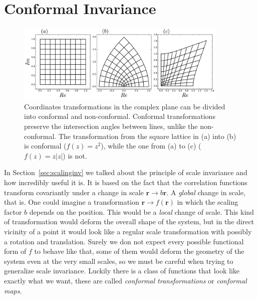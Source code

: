 \section{Conformal Invariance}
\label{ch:conf}

\begin{figure}[b]
\begin{center}
    \includegraphics[width=0.9\textwidth]{chapters/ch3-conf/figs/cmapex}
\end{center}
\caption{Coordinates transformations in the complex plane can be divided into
    conformal and non-conformal. Conformal transformations preserve the
    intersection angles between lines, unlike the non-conformal. The
    transformation from the square lattice in (a) into (b) is conformal
    ($f(z)=z^2$), while the one from (a) to (c) ($f(z)=z|z|$) is not.}
\label{fig:cmapex}
\end{figure}

In Section~\ref{sec:scalinginv} we talked about the principle of scale invariance
and how incredibly useful it is. It is based on the fact that the correlation
functions transform covariantly under a change in scale $\mathbf{r}\rightarrow
b\mathbf{r}$. A \textit{global} change in scale, that is. One could imagine a
transformation $\mathbf{r}\rightarrow f(\mathbf{r})$ in which the scaling
factor $b$ depends on the position. This would be a \textit{local} change of
scale. This kind of transformation would deform the overall shape of the
system, but in the direct vicinity of a point it would look like a regular
scale transformation with possibly a rotation and translation. Surely we don not
expect every possible functional form of $f$ to behave like that, some of them would
deform the geometry of the system even at the very small scales, so we must be
careful when trying to generalize scale invariance. Luckily there is a class of
functions that look like exactly what we want, these are called
\textit{conformal transformations} or \textit{conformal maps}.

